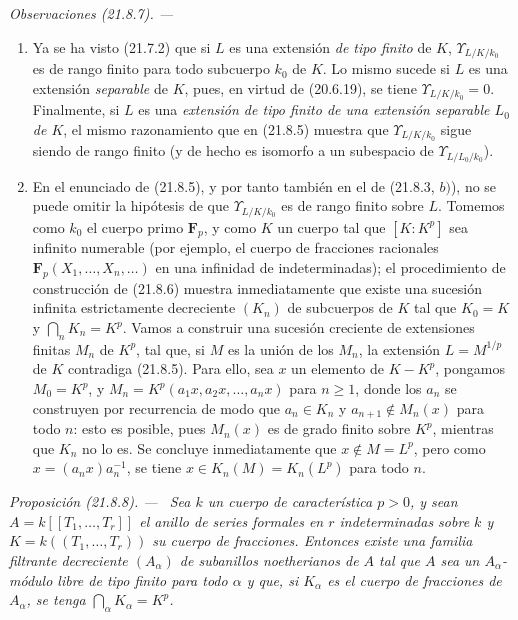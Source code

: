 \documentclass[10pt,oneside]{book}
\makeatletter
\newcommand{\setmanualcurrentlabel}[1]{\def\@currentlabel{#1}}
\newcommand{\oldpage}[2][]{%
  \setcounter{footnote}{0}%
  \marginpar{\scriptsize\textbf{#1}~|~#2}\ignorespaces}
\newenvironment{proposition}[1][]{%
  \setmanualcurrentlabel{#1}\par\medskip\noindent\itshape Proposición (#1). ---\ }{\par}
\newenvironment{remarks}[1][]{%
  \setmanualcurrentlabel{#1}\par\medskip\noindent\itshape Observaciones (#1). ---\ }{\par}
\providecommand{\setmin}{-}%
\makeatother
\begin{document}
\begin{remarks}[21.8.7]
\label{0.21.8.7-es}
\begin{enumerate}
  \item[(i)] Ya se ha visto (21.7.2) que si $L$ es una extensión
  \emph{de tipo finito} de $K$, $\Upsilon_{L/K/k_0}$ es de rango finito para
  todo subcuerpo $k_0$ de $K$. Lo mismo sucede si $L$ es una extensión
  \emph{separable} de $K$, pues, en virtud de (20.6.19), se tiene
  $\Upsilon_{L/K/k_0}=0$. Finalmente, si $L$ es una \emph{extensión de tipo
  finito de una extensión separable $L_0$ de $K$}, el mismo razonamiento que
  en (21.8.5) muestra que $\Upsilon_{L/K/k_0}$ sigue siendo de rango finito
  (y de hecho es isomorfo a un subespacio de $\Upsilon_{L/L_0/k_0}$).

  \oldpage[0\textsubscript{IV-1}]{175}
  \item[(ii)] En el enunciado de (21.8.5), y por tanto también en el de
  (21.8.3, $b)$), no se puede omitir la hipótesis de que
  $\Upsilon_{L/K/k_0}$ es de rango finito sobre $L$. Tomemos como $k_0$ el
  cuerpo primo $\mathbf F_p$, y como $K$ un cuerpo tal que $[K:K^p]$ sea
  infinito numerable (por ejemplo, el cuerpo de fracciones racionales
  $\mathbf F_p(X_1,\ldots,X_n,\ldots)$ en una infinidad de indeterminadas); el
  procedimiento de construcción de (21.8.6) muestra inmediatamente que existe
  una sucesión infinita estrictamente decreciente $(K_n)$ de subcuerpos de $K$
  tal que $K_0=K$ y $\bigcap_nK_n=K^p$. Vamos a construir una sucesión
  creciente de extensiones finitas $M_n$ de $K^p$, tal que, si $M$ es la unión
  de los $M_n$, la extensión $L=M^{1/p}$ de $K$ contradiga (21.8.5). Para
  ello, sea $x$ un elemento de $K\setmin K^p$, pongamos $M_0=K^p$, y
  $M_n=K^p(a_1x,a_2x,\ldots,a_nx)$ para $n\geqslant1$, donde los $a_n$ se
  construyen por recurrencia de modo que $a_n\in K_n$ y
  $a_{n+1}\notin M_n(x)$ para todo $n$: esto es posible, pues $M_n(x)$ es de
  grado finito sobre $K^p$, mientras que $K_n$ no lo es. Se concluye
  inmediatamente que $x\notin M=L^p$, pero como $x=(a_nx)a_n^{-1}$, se tiene
  $x\in K_n(M)=K_n(L^p)$ para todo $n$.
\end{enumerate}
\end{remarks}

\begin{proposition}[21.8.8]
\label{0.21.8.8-es}
Sea $k$ un cuerpo de característica $p>0$, y sean
$A=k[[T_1,\ldots,T_r]]$ el anillo de series formales en $r$ indeterminadas
sobre $k$ y $K=k((T_1,\ldots,T_r))$ su cuerpo de fracciones. Entonces existe
una familia filtrante decreciente $(A_\alpha)$ de subanillos noetherianos de
$A$ tal que $A$ sea un $A_\alpha$-módulo libre de tipo finito para todo
$\alpha$ y que, si $K_\alpha$ es el cuerpo de fracciones de $A_\alpha$, se
tenga $\bigcap_\alpha K_\alpha=K^p$.
\end{proposition}
\end{document}
